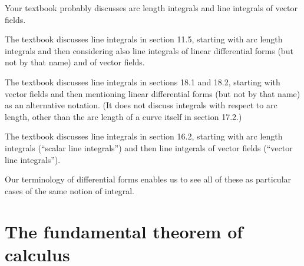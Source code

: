 \begin{notextbook}Your textbook probably discusses arc length integrals and line integrals of vector fields.\end{notextbook}%
\begin{stewart}The textbook discusses line integrals in section 11.5, starting with arc length integrals and then considering also line integrals of linear differential forms (but not by that name) and of vector fields.\end{stewart}%
\begin{hugheshallett}The textbook discusses line integrals in sections 18.1 and 18.2, starting with vector fields and then mentioning linear differential forms (but not by that name) as an alternative notation.
(It does not discuss integrals with respect to arc length, other than the arc length of a curve itself in section 17.2.)\end{hugheshallett}%
\begin{rogawski}The textbook discusses line integrals in section 16.2, starting with arc length integrals (``scalar line integrals'') and then line intgerals of vector fields (``vector line integrals'').\end{rogawski}
Our terminology of differential forms enables us to see all of these as particular cases of the same notion of integral.

\section{The fundamental theorem of calculus}
\label{sec:lineintegral-ftc}
